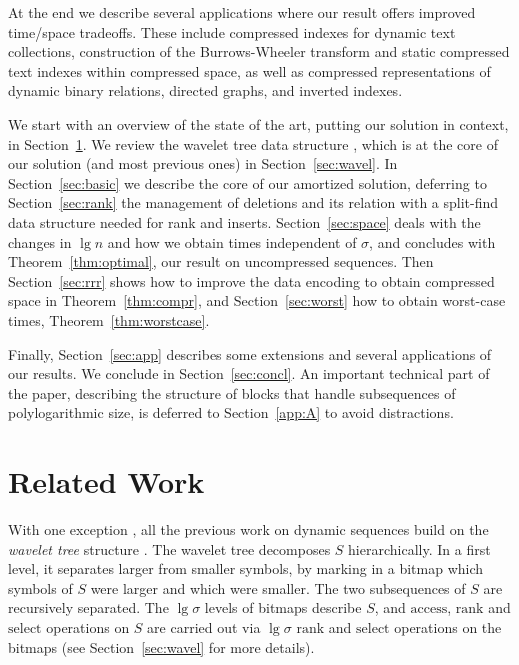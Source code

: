 \documentclass[11pt]{article}
\def\idrm#1{\ensuremath{\mathrm{#1}}}
\newcommand{\no}[1]{}
\newcommand{\ra}{\idrm{rank}}
\newcommand{\sel}{\idrm{select}}
\newcommand{\acc}{\idrm{access}}
\newcommand{\eps}{\varepsilon}
\begin{document}
\no{ -> needs quadratic blocks, at best, but how to handle the split-find
and partial sums?
As a second extension, we enhance the set of update operations to include
sequence splitting, concatenating, and general block updates. This makes up
a much stronger algebra on sequences. The time for these operations is
$O(\sigma\lg n)$, whereas the only previous solution \cite{NS10} achieved
$O(\sigma\lg^{1+\eps} n)$ for any constant $\epsilon>0$.
}

At the end we describe several applications where our result offers improved
time/space tradeoffs. These include compressed indexes for dynamic text 
collections, construction of the Burrows-Wheeler transform \cite{BW94} and 
static compressed text indexes within compressed space, as well as compressed
representations of dynamic binary relations, directed graphs, and inverted
indexes.
 
We start with an overview of the state of the art, putting our solution in 
context, in Section~\ref{sec:related}. We review the wavelet tree data 
structure \cite{GGV03}, which is at the core of our solution (and most
previous ones) in Section~\ref{sec:wavel}. In Section~\ref{sec:basic} we 
describe the core of
our amortized solution, deferring to Section~\ref{sec:rank} the management of 
deletions and its relation with a split-find data structure needed for rank
and inserts. Section~\ref{sec:space} deals with the changes in $\lg n$ and
how we obtain times independent of $\sigma$, and concludes
with Theorem~\ref{thm:optimal}, our result on uncompressed sequences.
Then Section~\ref{sec:rrr} shows how to improve the data encoding to obtain
compressed space in Theorem~\ref{thm:compr}, and Section~\ref{sec:worst} 
how to obtain worst-case times, Theorem~\ref{thm:worstcase}.
\no{Finally, Section~\ref{sec:ext} describes some extensions of our results and
Section~\ref{sec:app} describes various applications. }
Finally, Section~\ref{sec:app} describes some extensions and several applications of our results.
We conclude in
Section~\ref{sec:concl}. An important technical part of the paper, describing
the structure of blocks that handle subsequences of polylogarithmic size, is
deferred to Section~\ref{app:A} to avoid distractions.

\section{Related Work}
\label{sec:related}

With one exception \cite{GHSV07}, all the previous work on dynamic sequences
build on the {\em wavelet tree} structure \cite{GGV03}.
The wavelet tree decomposes $S$ hierarchically. In a first level, it separates
larger from smaller symbols, by marking in a bitmap which symbols of $S$ were
larger and which were smaller. The two subsequences of $S$ are recursively
separated. The $\lg\sigma$ levels of bitmaps describe $S$, and $\acc$, $\ra$
and $\sel$ operations on $S$ are carried out via $\lg\sigma$ $\ra$ and
$\sel$ operations on the bitmaps (see Section~\ref{sec:wavel} for more details).
\end{document}
